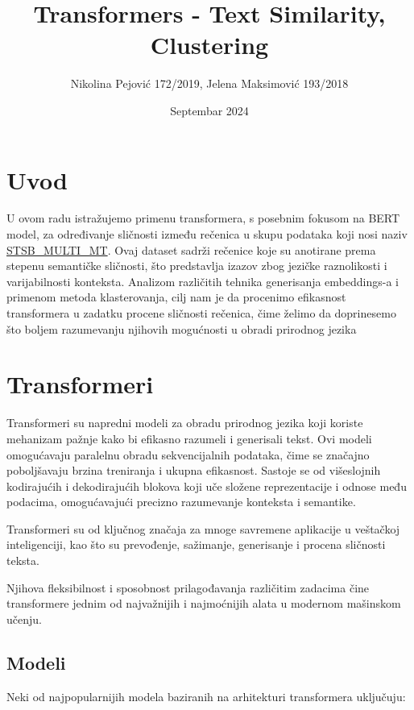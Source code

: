 \documentclass{article}
\title{\textbf{Transformers - Text Similarity, Clustering}}
\author{Nikolina Pejović 172/2019,  Jelena Maksimović 193/2018}
\date{Septembar 2024}
\begin{document}
\maketitle

\section{Uvod}

U ovom radu istražujemo primenu transformera, s posebnim fokusom na BERT model, za određivanje sličnosti između rečenica u skupu podataka koji nosi naziv \href{https://huggingface.co/datasets/PhilipMay/stsb_multi_mt}{STSB\_MULTI\_MT}. Ovaj dataset sadrži rečenice koje su anotirane prema stepenu semantičke sličnosti, što predstavlja izazov zbog jezičke raznolikosti i varijabilnosti konteksta. Analizom različitih tehnika generisanja embeddings-a i primenom metoda klasterovanja, cilj nam je da procenimo efikasnost transformera u zadatku procene sličnosti rečenica, čime želimo da doprinesemo što boljem razumevanju njihovih mogućnosti u obradi prirodnog jezika


\section{Transformeri}

Transformeri su napredni modeli za obradu prirodnog jezika koji koriste mehanizam pažnje kako bi efikasno razumeli i generisali tekst. Ovi modeli omogućavaju paralelnu obradu sekvencijalnih podataka, čime se značajno poboljšavaju brzina treniranja i ukupna efikasnost. Sastoje se od višeslojnih kodirajućih i dekodirajućih blokova koji uče složene reprezentacije i odnose među podacima, omogućavajući precizno razumevanje konteksta i semantike.

Transformeri su od ključnog značaja za mnoge savremene aplikacije u veštačkoj inteligenciji, kao što su prevođenje, sažimanje, generisanje i procena sličnosti teksta.

Njihova fleksibilnost i sposobnost prilagođavanja različitim zadacima čine transformere jednim od najvažnijih i najmoćnijih alata u modernom mašinskom učenju.

\subsection{Modeli}


Neki od najpopularnijih modela baziranih na arhitekturi transformera uključuju:
\end{document}
